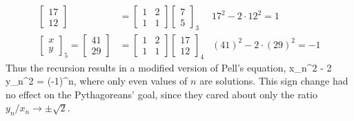 \documentclass{ximera}
\begin{document}
\begin{align*}
\begin{bmatrix}
17\\12
\end{bmatrix}
&=
\begin{bmatrix}
1 & 2 \\
1 & 1
\end{bmatrix}
\begin{bmatrix}
7\\5
\end{bmatrix}_3
&  17^2 -2\cdot{12}^2 = 1 
\\
\begin{bmatrix}
x \\ y
\end{bmatrix}_5
=
\begin{bmatrix}
41\\29
\end{bmatrix}
&=
\begin{bmatrix}
1 & 2 \\
1 & 1
\end{bmatrix}
\begin{bmatrix}
17 \\ 12
\end{bmatrix}_4
&  {(41)}^2 -2\cdot{(29)}^2 = -1
	\end{align*}
Thus the recursion results in a modified version of Pell's equation,
\be
x_n^2 - 2 y_n^2 = (-1)^n,
\label{eq:PellResult}
\ee
where only even values of $n$ are solutions. This sign change had no effect on the Pythagoreans' goal,
since they cared about only the ratio $y_n/x_n \rightarrow \pm\sqrt{2}$.
\end{document}
